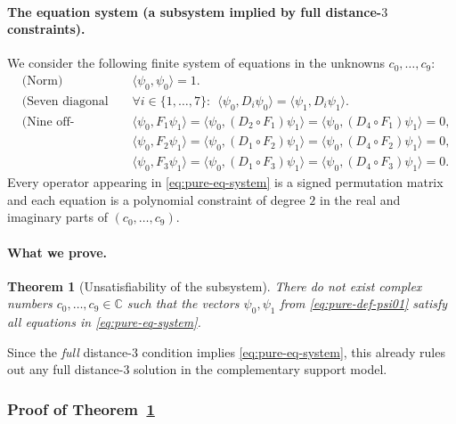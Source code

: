 \documentclass[11pt]{article}
\newtheorem{theorem}{Theorem}
\begin{document}
\paragraph{The equation system (a subsystem implied by full distance-$3$ constraints).}
We consider the following finite system of equations in the unknowns $c_0,\dots,c_9$:
\begin{equation}
\label{eq:pure-eq-system}
\boxed{
\begin{aligned}
&\text{(Norm)}\quad &&\langle \psi_0,\psi_0\rangle=1.\\[1mm]
&\text{(Seven diagonal equations)}\quad &&\forall i\in\{1,\dots,7\}:\ \ \langle \psi_0,D_i\psi_0\rangle=\langle \psi_1,D_i\psi_1\rangle.\\[1mm]
&\text{(Nine off-diagonal equations)}\quad
&&\langle \psi_0, F_1\psi_1\rangle=\langle \psi_0, (D_2\!\circ F_1)\psi_1\rangle=\langle \psi_0,(D_4\!\circ F_1)\psi_1\rangle=0,\\
&&&\langle \psi_0, F_2\psi_1\rangle=\langle \psi_0, (D_1\!\circ F_2)\psi_1\rangle=\langle \psi_0,(D_4\!\circ F_2)\psi_1\rangle=0,\\
&&&\langle \psi_0, F_3\psi_1\rangle=\langle \psi_0, (D_1\!\circ F_3)\psi_1\rangle=\langle \psi_0,(D_4\!\circ F_3)\psi_1\rangle=0.
\end{aligned}}
\end{equation}
Every operator appearing in \eqref{eq:pure-eq-system} is a signed permutation matrix and each equation is a polynomial
constraint of degree $2$ in the real and imaginary parts of $(c_0,\dots,c_9)$.

\paragraph{What we prove.}
\begin{theorem}[Unsatisfiability of the subsystem]
\label{thm:pure-nogo-subsystem}
There do not exist complex numbers $c_0,\dots,c_9\in\mathbb C$ such that the vectors
$\psi_0,\psi_1$ from \eqref{eq:pure-def-psi01} satisfy all equations in \eqref{eq:pure-eq-system}.
\end{theorem}

Since the \emph{full} distance-$3$ condition implies \eqref{eq:pure-eq-system}, this already rules out
any full distance-$3$ solution in the complementary support model.

\subsubsection*{Proof of Theorem~\ref{thm:pure-nogo-subsystem}}
\end{document}

